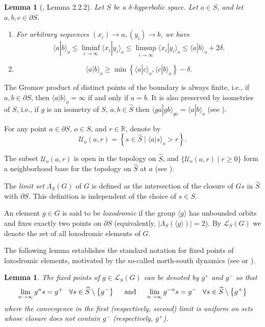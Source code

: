\documentclass[11pt,letterpaper]{article}
\renewcommand{\l}{\langle}
\renewcommand{\r}{\rangle}
\newtheorem{lem}[thm]{Lemma}
\theoremstyle{definition}
\theoremstyle{remark}
\begin{document}
\begin{lem}[\cite{BS07}, Lemma 2.2.2]\label{lemma 2.2.2}
Let $S$ be a $\delta$-hyperbolic space. Let $o\in S$, and let $a, b, c \in \partial S$.
\begin{enumerate}
\item For arbitrary sequences $\left(x_i\right) \rightarrow a,\left(y_i\right) \rightarrow b$, we have
$$
\l a| b\r_o \leq \liminf _{i \rightarrow \infty}\l x_i| y_i\r_o \leq \limsup _{i \rightarrow \infty}\l x_i|y_i\r_o \leq \l a| b\r_o+2 \delta .
$$
\item 
$$
\l a|b \r_o \geq \min\left\{\l a|c \r_o, \l c|b\r_o\right\} - \delta.
$$ 

\end{enumerate}
\end{lem}

The Gromov product of distinct points of the boundary is always finite, i.e., if $a, b \in \partial S$, then $\l a|b\rangle_o = \infty$ if and only if $a=b$. It is also preserved by isometries of $S$, i.e., if $g$ is an isometry of $S$, $a,b \in \widehat{S}$ then $\l ga|gb \r_{go} = \l a|b\r_o$ (see \cite[Section 3.4.1]{DSU}).

For any point $a \in \partial S$, $o \in S$, and $r \in \mathbb R$, denote by
$$\mathcal U_o(a,r) = \left \{ s \in \widehat S \mid \l a|s\r_o > r \right \}.$$

The subset $\mathcal U_o(a,r)$ is open in the topology on $\widehat{S}$, and $\{ \mathcal U_o(a,r) \mid r \geq 0 \}$ form a neighborhood base for the topology on $\widehat{S}$ at $a$ (see \cite[Remark 3.4.15 (II)]{DSU}).

The \textit{limit set} $\Lambda_S(G)$ of $G$ is defined as the intersection of the closure of $Gs$ in $\widehat S$ with $\partial S$. This definition is independent of the choice of $s\in S$.

An element $g \in G$ is said to be {\it loxodromic} if the group $\l g\rangle $ has unbounded orbits and fixes exactly two points on $\partial S$ (equivalently, $|\Lambda_S(\l g\r)|=2$). By $\mathcal{L}_S(G)$ we denote the set of all loxodromic elements of $G$. 

The following lemma establishes the standard notation for fixed points of loxodromic elements, motivated by the so-called north-south dynamics (see \cite[Lemma 8.1.G]{Gro87} or \cite[Theorem 6.1.10]{DSU}).

\begin{lem} \label{north-south}
The fixed points of $g \in \mathcal{L}_S(G)$ can be denoted by $g^+$ and $g^-$ so that
$$
\lim _{n \rightarrow \infty} g^n s=g^{+} \;\;\;  \forall s \in \widehat S \setminus \left\{g^{-}\right\}\;\;\;\;\; {\rm and }\;\;\;\;\; \lim _{n \rightarrow \infty} g^{-n} s=g^{-} \;\;\;  \forall s \in \widehat S \setminus \left\{g^{+}\right\}
$$
where the convergence in the first (respectively, second) limit is uniform on sets whose closure does not contain $g^{-}$ (respectively, $g^+$).
\end{lem}
\end{document}
